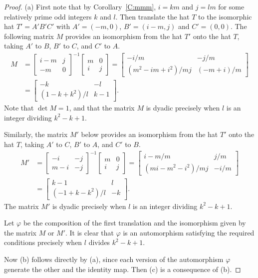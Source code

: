 \documentclass[10pt,a4paper]{amsart}
\def\p{\varphi}
\begin{document}
\begin{proof}
(a) First note that by Corollary~\ref{C:mmm}, $i = km$ and $j = lm$ for some relatively prime
odd integers $k$ and $l$. Then translate the hat $T$ to the isomorphic hat $T' = A'B'C'$ with
$A' = (-m,0)$, $B' = (i-m,j)$ and $C' = (0,0)$. The following matrix $M$ provides an
isomorphism from the hat $T'$ onto the hat $T$, taking $A'$ to $B$, $B'$ to $C$, and $C'$ to
$A$.
\begin{align*}
M &=
	\begin{bmatrix}
		i-m&j\\
		-m&0
	\end{bmatrix}^{-1}
	\begin{bmatrix}
		m&0\\
		i&j
	\end{bmatrix}
    =\begin{bmatrix}
	-i/m&-j/m\\
	(m^2-im+i^2)/mj&(-m+i)/m
    \end{bmatrix}\\
    &= \begin{bmatrix}
     -k&-l\\
	(1-k+k^2)/l&k-1
    \end{bmatrix}.
\end{align*}
Note that $\det M = 1$, and that the matrix $M$ is dyadic precisely when $l$ is an integer dividing
$k^2 - k + 1$.

Similarly, the matrix $M'$ below provides an isomorphism from the hat $T'$ onto the hat $T$,
taking $A'$ to $C$, $B'$ to $A$, and $C'$ to $B$.
\begin{align*}
M' &=
	\begin{bmatrix}
		-i&-j\\
		m-i&-j
	\end{bmatrix}^{-1}
	\begin{bmatrix}
		m&0\\
		i&j
	\end{bmatrix}
    =\begin{bmatrix}
	i-m/m&j/m\\
	(mi-m^2 -i^2)/mj&-i/m
    \end{bmatrix}\\
    &= \begin{bmatrix}
     k-1&l\\
	(-1+k-k^2)/l&-k
    \end{bmatrix}.
\end{align*}
The matrix $M'$ is dyadic precisely when $l$ is an integer dividing $k^2 - k + 1$.

Let $\p$ be the composition of the first translation and the isomorphism given by the matrix $M$ or $M'$. It is clear that $\p$ is an automorphism satisfying the required conditions precisely when $l$ divides $k^2 - k + 1$.

Now (b) follows directly by (a), since each version of the automorphism $\p$ generate the other and the identity map. Then (c) is a consequence of (b).
\end{proof}
\end{document}
